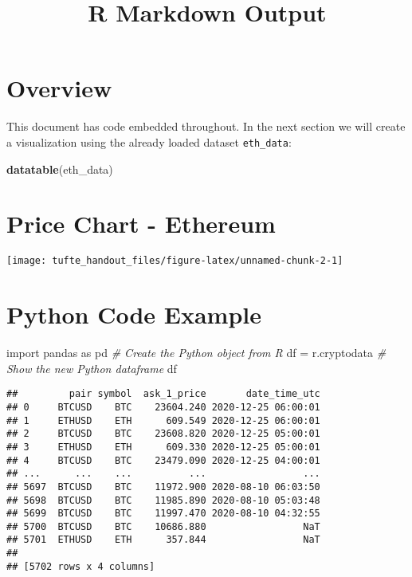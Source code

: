 \documentclass[]{tufte-handout}
\title{R Markdown Output}
\date{}
\newenvironment{Shaded}{}{}
\newcommand{\CommentTok}[1]{\textcolor[rgb]{0.38,0.63,0.69}{\textit{#1}}}
\newcommand{\ImportTok}[1]{#1}
\newcommand{\KeywordTok}[1]{\textcolor[rgb]{0.00,0.44,0.13}{\textbf{#1}}}
\newcommand{\NormalTok}[1]{#1}
\newcommand{\OperatorTok}[1]{\textcolor[rgb]{0.40,0.40,0.40}{#1}}
\begin{document}
\maketitle




\hypertarget{overview}{%
\section{Overview}\label{overview}}

This document has code embedded throughout. In the next section we will
create a visualization using the already loaded dataset
\texttt{eth\_data}:

\begin{Shaded}
\begin{Highlighting}[]
\KeywordTok{datatable}\NormalTok{(eth_data)}
\end{Highlighting}
\end{Shaded}

\hypertarget{htmlwidget-fbdf3ea39826ef24b06f}{}

\hypertarget{price-chart---ethereum}{%
\section{Price Chart - Ethereum}\label{price-chart---ethereum}}

\texttt{[image: tufte\_handout\_files/figure-latex/unnamed-chunk-2-1]}

\hypertarget{python-code-example}{%
\section{Python Code Example}\label{python-code-example}}

\begin{Shaded}
\begin{Highlighting}[]
\ImportTok{import}\NormalTok{ pandas }\ImportTok{as}\NormalTok{ pd}
\CommentTok{# Create the Python object from R}
\NormalTok{df }\OperatorTok{=}\NormalTok{ r.cryptodata}
\CommentTok{# Show the new Python dataframe}
\NormalTok{df}
\end{Highlighting}
\end{Shaded}

\begin{verbatim}
##         pair symbol  ask_1_price       date_time_utc
## 0     BTCUSD    BTC    23604.240 2020-12-25 06:00:01
## 1     ETHUSD    ETH      609.549 2020-12-25 06:00:01
## 2     BTCUSD    BTC    23608.820 2020-12-25 05:00:01
## 3     ETHUSD    ETH      609.330 2020-12-25 05:00:01
## 4     BTCUSD    BTC    23479.090 2020-12-25 04:00:01
## ...      ...    ...          ...                 ...
## 5697  BTCUSD    BTC    11972.900 2020-08-10 06:03:50
## 5698  BTCUSD    BTC    11985.890 2020-08-10 05:03:48
## 5699  BTCUSD    BTC    11997.470 2020-08-10 04:32:55
## 5700  BTCUSD    BTC    10686.880                 NaT
## 5701  ETHUSD    ETH      357.844                 NaT
## 
## [5702 rows x 4 columns]
\end{verbatim}
\end{document}
